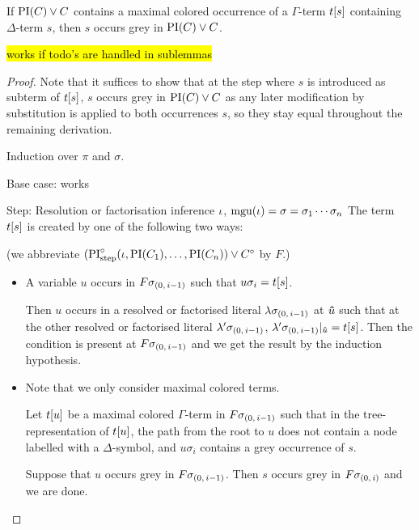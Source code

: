 \documentclass[,%
	draft=false,%
	numbers=noendperiod
	12pt,
	a4paper,
	oneside,%
	openany,
]{memoir}
\begin{document}
\nopagebreak
\begin{lemma}
	If ${\operatorname{PI}(C) \lor C}$ contains a maximal colored occurrence of a $\Gamma$-term $t[s]$ containing $\Delta$-term $s$, then 
	$s$ occurs grey in $\operatorname{PI}(C) \lor C$.
\end{lemma}
\hl{works if todo's are handled in sublemmas}
\begin{proof}
	Note that it suffices to show that at the step where $s$ is introduced as subterm of $t[s]$, $s$ occurs grey in $\operatorname{PI}(C) \lor C$ as any later modification by substitution is applied to both occurrences $s$, so they stay equal throughout the remaining derivation. 
	\medskip

	\noindent
	Induction over $\pi$ and $\sigma$.
	\medskip

	\noindent
	Base case: works
	\medskip

	\noindent
	Step:
	Resolution or factorisation inference $\iota$, $\operatorname{mgu}(\iota) = \sigma = \sigma_1\cdots\sigma_n$ 
	The term $t[s]$ is created by one of the following two ways: 

	(we abbreviate 
	$(\operatorname{PI}^\circ_{\mathrm{step}}(\iota, \operatorname{PI}(C_1), \dots, \operatorname{PI}(C_n)) \lor C^\circ$ by $F$.)
	\begin{itemize}
		\item
			A variable $u$ occurs in $F\sigma_{(0,\,i-1)}$ such that $u\sigma_i = t[s]$.

			Then $u$ occurs in a resolved or factorised literal $\lambda\sigma_{(0,\,i-1)}$ at $\bm\hat u$ such that at the other resolved or factorised literal $\lambda'\sigma_{(0,\,i-1)}$, $\lambda'\sigma_{(0,\,i-1)}|_{\bm\hat u} = t[s]$.
			Then the condition is present at $F\sigma_{(0,\,i-1)}$ and we get the result by the induction hypothesis. 

		\item 
			Note that we only consider maximal colored terms.

			Let $t[u]$ be a maximal colored $\Gamma$-term in $F\sigma_{(0,\,i-1)}$ such that in the tree-representation of $t[u]$, the path from the root to $u$ does not contain a node labelled with a $\Delta$-symbol, and $u\sigma_i$ contains a grey occurrence of $s$.


			Suppose that $u$ occurs grey in $F\sigma_{(0,\,i-1)}$.
			Then $s$ occurs grey in $F\sigma_{(0,\,i)}$ and we are done.


\end{itemize}
\end{proof}
\end{document}
